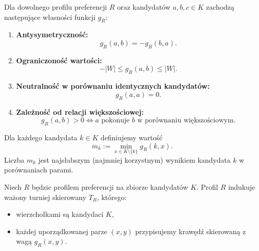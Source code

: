 \documentclass[12pt,a4paper]{mwrep}
\begin{document}
	\begin{lemma}
		\label{lem:wlasnosci-marginesu}
		Dla dowolnego profilu preferencji \(R\) oraz kandydatów \(a,b,c \in K\) zachodzą następujące własności funkcji \(g_R\):
		
		\begin{enumerate}
			
			\item \textbf{Antysymetryczność:}
			\[
			g_R(a,b) = - g_R(b,a).
			\]
			
			\item \textbf{Ograniczoność wartości:}
			\[
			- |W| \leq g_R(a,b) \leq |W|.
			\]
			
			\item \textbf{Neutralność w porównaniu identycznych kandydatów:}
			\[
			g_R(a,a) = 0.
			\]
			
			\item \textbf{Zależność od relacji większościowej:}
			\[
			g_R(a,b) > 0 \iff a \text{ pokonuje } b \text{ w porównaniu większościowym}.
			\]
			
		\end{enumerate}
	\end{lemma}

	\begin{definition}
		\label{def:wartosc-minimalnego-wyniku-kandydata}
		Dla każdego kandydata \(k \in K\) definiujemy wartość
		\[
		m_k := \min_{x \in K \setminus \{k\}} g_R(k,x).
		\]
		Liczba \(m_k\) jest najsłabszym (najmniej korzystnym) wynikiem kandydata \(k\) w porównaniach parami.
	\end{definition}
	
	

	\begin{definition}
		Niech \(R\) będzie profilem preferencji na zbiorze kandydatów \(K\).
		Profil \(R\) indukuje ważony turniej skierowany \(T_R\), którego:
		\begin{itemize}
			\item wierzchołkami są kandydaci \(K\),
			\item każdej uporządkowanej parze \((x,y)\) przypisujemy krawędź skierowaną z wagą \(g_R(x,y)\).
		\end{itemize}
	\end{definition}
\end{document}
